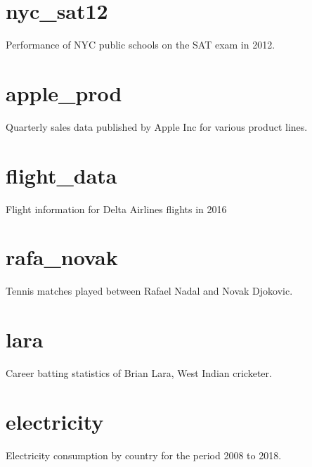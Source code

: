 \documentclass[]{book}
\begin{document}
\hypertarget{nycsat12}{%
\section*{nyc\_sat12}\label{nycsat12}}

Performance of NYC public schools on the SAT exam in 2012.

\hypertarget{apple}{%
\section*{apple\_prod}\label{apple}}

Quarterly sales data published by Apple Inc for various product lines.

\hypertarget{flights}{%
\section*{flight\_data}\label{flights}}

Flight information for Delta Airlines flights in 2016

\hypertarget{rafanovak}{%
\section*{rafa\_novak}\label{rafanovak}}

Tennis matches played between Rafael Nadal and Novak Djokovic.

\hypertarget{lara}{%
\section*{lara}\label{lara}}

Career batting statistics of Brian Lara, West Indian cricketer.

\hypertarget{electricity}{%
\section*{electricity}\label{electricity}}

Electricity consumption by country for the period 2008 to 2018.


\end{document}
